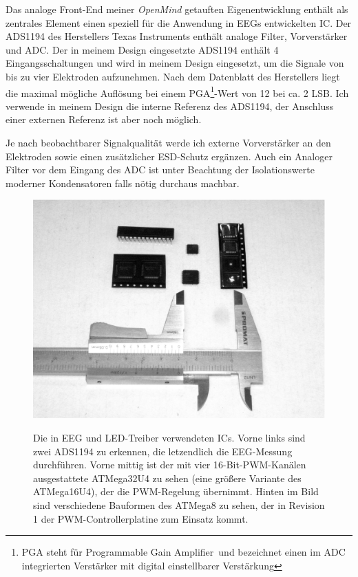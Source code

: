 \documentclass[12pt,a4paper,notitlepage]{article}
\newcommand{\annot}[1]{\textcolor{red}{#1}}
\begin{document}
\newglossaryentry{LSB}{name={LSB}, description={\annot{FIXME}}}
Das analoge Front-End meiner \emph{OpenMind} getauften Eigenentwicklung enthält als zentrales Element einen speziell für die Anwendung in \glspl{EEG} entwickelten \gls{IC}. Der ADS1194 des Herstellers Texas Instruments enthält analoge Filter, Vorverstärker und ADC\cite{TEXAS1}. Der in meinem Design eingesetzte ADS1194 enthält 4 Eingangsschaltungen und wird in meinem Design eingesetzt, um die Signale von bis zu vier Elektroden aufzunehmen. Nach dem Datenblatt des Herstellers liegt die maximal mögliche Auflösung bei einem PGA\footnote{PGA steht für \glqq Programmable Gain Amplifier\grqq\ und bezeichnet einen im ADC integrierten Verstärker mit digital einstellbarer Verstärkung}-Wert von 12 bei ca. 2 \gls{LSB}. Ich verwende in meinem Design die interne Referenz des ADS1194, der Anschluss einer externen Referenz ist aber noch möglich\cite{TEXAS1,TEXAS11,ANALOG6,LINEAR6,MAXIM6}.

Je nach beobachtbarer Signalqualität werde ich externe Vorverstärker an den Elektroden sowie einen zusätzlicher ESD-Schutz ergänzen. Auch ein Analoger Filter vor dem Eingang des ADC ist unter Beachtung der Isolationswerte moderner Kondensatoren falls nötig durchaus machbar\cite{PHILIPS3,PHILIPS4,PHILIPS5,PHILIPS6,WIMA1,STM1,CHEEVER1,NATIONAL2,MAXIM45}.

\begin{figure}
\centering
\includegraphics[width=15cm]{images/chips_smaller.eps}
\label{ics_used}
\caption{Die in EEG und LED-Treiber verwendeten ICs. Vorne links sind zwei ADS1194 zu erkennen, die letzendlich die EEG-Messung durchführen. Vorne mittig ist der mit vier 16-Bit-PWM-Kanälen ausgestattete ATMega32U4 zu sehen (eine größere Variante des ATMega16U4), der die PWM-Regelung übernimmt. Hinten im Bild sind verschiedene Bauformen des ATMega8 zu sehen, der in Revision 1 der PWM-Controllerplatine zum Einsatz kommt.}
\end{figure}
\end{document}
